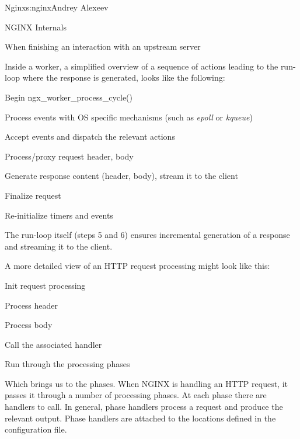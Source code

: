 \begin{aosachapter}{Nginx}{s:nginx}{Andrey Alexeev}
\begin{aosasect1}{NGINX Internals}
\begin{aosaitemize}
\item When finishing an interaction with an upstream server

\end{aosaitemize}

Inside a worker, a simplified overview of a sequence of actions
leading to the run-loop where the response is generated, looks like
the following:

\begin{aosaenumerate}

\item Begin ngx\_worker\_process\_cycle()

\item Process events with OS specific mechanisms (such as \emph{epoll}
or \emph{kqueue})

\item Accept events and dispatch the relevant actions

\item Process/proxy request header, body

\item Generate response content (header, body), stream it to the
client

\item Finalize request

\item Re-initialize timers and events

\end{aosaenumerate}

The run-loop itself (steps 5 and 6) ensures incremental generation of
a response and streaming it to the client.

A more detailed view of an HTTP request processing might look like
this:

\begin{aosaitemize}

\item Init request processing

\item Process header

\item Process body

\item Call the associated handler

\item Run through the processing phases

\end{aosaitemize}

Which brings us to the phases. When NGINX is handling an HTTP request,
it passes it through a number of processing phases. At each phase
there are handlers to call. In general, phase handlers process a
request and produce the relevant output. Phase handlers are attached
to the locations defined in the configuration file.


\end{aosasect1}
\end{aosachapter}
